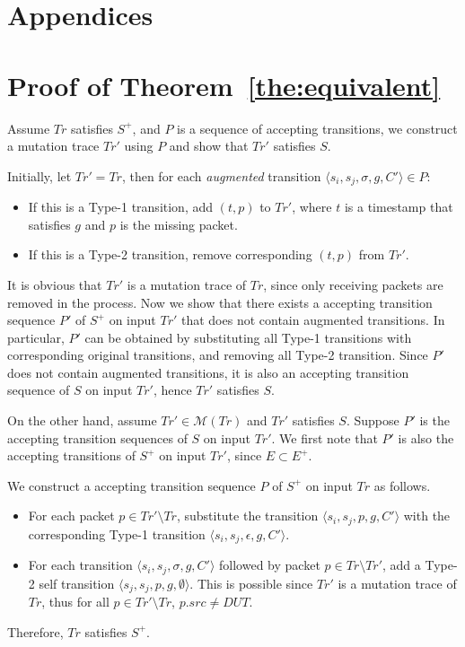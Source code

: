 \section*{Appendices}
\appendix

\section{Proof of Theorem~\ref{the:equivalent}}
Assume $Tr$ satisfies $S^+$, and $P$ is a sequence of accepting transitions,
we construct a mutation trace $Tr'$ using $P$ and show that $Tr'$ satisfies
$S$.

Initially, let $Tr'=Tr$, then for each \textit{augmented} transition $\langle s_i,
s_j, \sigma, g, C'\rangle \in P$:
\begin{itemize}
  \item If this is a Type-1 transition, add $(t, p)$ to $Tr'$, where $t$ is a
    timestamp that satisfies $g$ and $p$ is the missing packet.
  \item If this is a Type-2 transition, remove corresponding $(t, p)$ from
    $Tr'$.
\end{itemize}
It is obvious that $Tr'$ is a mutation trace of $Tr$, since only receiving
packets are removed in the process.
%
Now we show that there exists a accepting
transition sequence $P'$ of $S^+$ on input $Tr'$ that does not contain
augmented transitions.
%
In particular, $P'$ can be obtained by substituting all
Type-1 transitions with corresponding original transitions, and removing all
Type-2 transition.
%
Since $P'$ does not contain augmented transitions, it is also an accepting
transition sequence of $S$ on input $Tr'$, hence $Tr'$ satisfies $S$.

On the other hand, assume $Tr' \in \mathcal{M}(Tr)$ and $Tr'$ satisfies $S$.
Suppose $P'$ is the accepting transition sequences of $S$ on input $Tr'$.
%
We first note that $P'$ is also the accepting transitions of $S^+$ on input
$Tr'$, since $E \subset E^+$.

We construct a accepting transition sequence $P$ of $S^+$ on input $Tr$ as
follows.
\begin{itemize}
  \item For each packet $p \in Tr' \setminus Tr$, substitute the transition
    $\langle s_i, s_j, p, g, C'\rangle$ with the corresponding Type-1
    transition $\langle s_i, s_j, \epsilon, g, C'\rangle$.
  \item For each transition $\langle s_i, s_j, \sigma, g, C'\rangle$
    followed by packet $p \in Tr\setminus Tr'$, add a Type-2 self
    transition $\langle s_j, s_j, p, g, \emptyset\rangle$. This is
    possible since $Tr'$ is a mutation trace of $Tr$, thus  for all $p \in Tr'
    \setminus Tr$, $p.src \ne DUT$.
\end{itemize}
Therefore, $Tr$ satisfies $S^+$.

